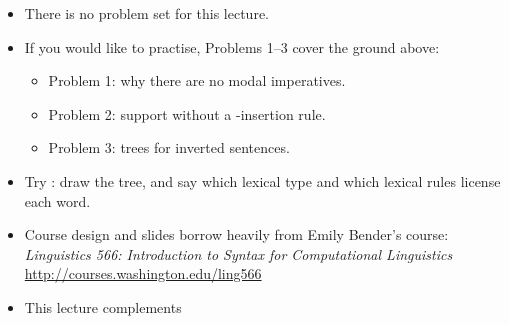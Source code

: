 \documentclass[a4paper,landscape,headrule,footrule]{foils}
\begin{document}
\begin{itemize}
\item There is no problem set for this lecture.
\item If you would like to practise, \citet[Chapter 13]{sag:wasow:bender:2003}
  Problems 1--3 cover the ground above:
  \begin{itemize}
  \item Problem 1: why there are no modal imperatives.
  \item Problem 2:  support without a -insertion rule.
  \item Problem 3: trees for inverted sentences.
  \end{itemize}
\item Try : draw the tree,
  and say which lexical type and which lexical rules license each word.
\end{itemize}

\overview
{}


\begin{itemize}
\item Course design and slides borrow heavily from Emily Bender's course:
\textit{Linguistics 566: Introduction to Syntax for Computational Linguistics}
\\ \url{http://courses.washington.edu/ling566}
\item This lecture complements \citet[Chapter 13]{sag:wasow:bender:2003}
\end{itemize}
\small


\end{document}
